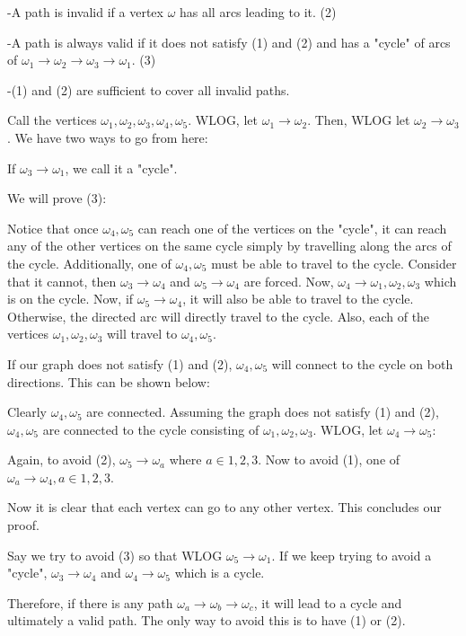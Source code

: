 \begin{enumerate}
 -A path is invalid if a vertex $\omega$ has all arcs leading to it. (2)

 -A path is always valid if it does not satisfy (1) and (2) and has a "cycle" of arcs of $\omega_1 \to \omega_2 \to \omega_3 \to \omega_1$. (3)

 -(1) and (2) are sufficient to cover all invalid paths.

 Call the vertices $\omega_1, \omega_2, \omega_3, \omega_4, \omega_5$. WLOG, let $\omega_1 \to \omega_2$. Then, WLOG let $\omega_2 \to \omega_3$. We have two ways to go from here:

 If $\omega_3 \to \omega_1$, we call it a "cycle".

 We will prove (3):

 Notice that once $\omega_4, \omega_5$ can reach one of the vertices on the "cycle", it can reach any of the other vertices on the same cycle simply by travelling along the arcs of the cycle. Additionally, one of $\omega_4, \omega_5$ must be able to travel to the cycle. Consider that it cannot, then $\omega_3 \to \omega_4$ and $\omega_5 \to \omega_4$ are forced. Now, $\omega_4 \to \omega_1, \omega_2, \omega_3$ which is on the cycle. Now, if $\omega_5 \to \omega_4$, it will also be able to travel to the cycle.  Otherwise, the directed arc will directly travel to the cycle. Also, each of the vertices $\omega_1, \omega_2, \omega_3$ will travel to $\omega_4, \omega_5$. 

 If our graph does not satisfy (1) and (2), $\omega_4, \omega_5$ will connect to the cycle on both directions. This can be shown below:

 Clearly $\omega_4, \omega_5$ are connected. Assuming the graph does not satisfy (1) and (2), $\omega_4, \omega_5$ are connected to the cycle consisting of $\omega_1, \omega_2, \omega_3$. WLOG, let $\omega_4 \to \omega_5$:

 Again, to avoid (2), $\omega_5 \to \omega_a$ where $a\in{1,2,3}$. Now to avoid (1), one of $\omega_a \to \omega_4, a\in{1,2,3}$.

 Now it is clear that each vertex can go to any other vertex. This concludes our proof.

 Say we try to avoid (3) so that WLOG $\omega_5 \to \omega_1$. If we keep trying to avoid a "cycle", $\omega_3 \to \omega_4$ and $\omega_4 \to \omega_5$ which is a cycle. 

 Therefore, if there is any path $\omega_a \to \omega_b \to \omega_c$, it will lead to a cycle and ultimately a valid path. The only way to avoid this is to have (1) or (2).


\end{enumerate}
